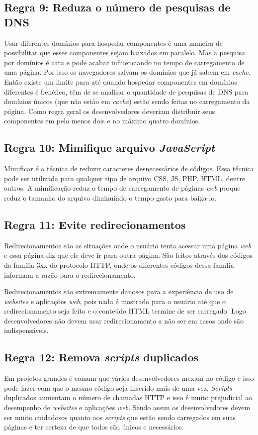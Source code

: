 \subsection{Regra 9: Reduza o número de pesquisas de DNS}
\label{subsec:highperformance_regra9}
Usar diferentes domínios para hospedar componentes é uma maneira de possibilitar que esses componentes sejam baixados em paralelo. Mas a pesquisa por domínios é cara e pode acabar influenciando no tempo de carregamento de uma página. Por isso os navegadores salvam os domínios que já sabem em \textit{cache}. Então existe um limite para até quando hospedar componentes em domínios diferentes é benéfico, têm de se analisar o quantidade de pesquisas de DNS para domínios únicos (que não estão em \textit{cache}) estão sendo feitas no carregamento da página. Como regra geral os desenvolvedores deveriam distribuir seus componentes em pelo menos dois e no máximo quatro domínios.

\subsection{Regra 10: Mimifique arquivo \textit{JavaScript}}
\label{subsec:highperformance_regra10}
Mimificar é a técnica de reduzir caracteres desnecessários de códigos. Essa técnica pode ser utilizada para qualquer tipo de arquivo CSS, JS, PHP, HTML, dentre outros. A mimificação reduz o tempo de carregamento de páginas \textit{web} porque reduz o tamanho do arquivo diminuindo o tempo gasto para baixa-lo.

\subsection{Regra 11: Evite redirecionamentos}
\label{subsec:highperformance_regra11}
Redirecionamentos são as situações onde o usuário tenta acessar uma página \textit{web} e essa página diz que ele deve ir para outra página. São feitos através dos códigos da família 3xx do protocolo HTTP, onde os diferentes códigos dessa família informam a razão para o redirecionamento.

Redirecionamentos são extremamente danosos para a experiência de uso de \textit{websites} e aplicações \textit{web}, pois nada é mostrado para o usuário até que o redirecionamento seja feito e o conteúdo HTML termine de ser carregado. Logo desenvolvedores não devem usar redirecionamento a não ser em casos onde são indispensáveis.

\subsection{Regra 12: Remova \textit{scripts} duplicados}
\label{subsec:highperformance_regra12}
Em projetos grandes é comum que vários desenvolvedores mexam no código e isso pode fazer com que o mesmo código seja inserido mais de uma vez. \textit{Scripts} duplicados aumentam o número de chamadas HTTP e isso é muito prejudicial ao desempenho de \textit{websites} e aplicações \textit{web}. Sendo assim os desenvolvedores devem ser muito cuidadosos quanto aos \textit{scripts} que estão sendo carregados em suas páginas e ter certeza de que todos são únicos e necessários.

